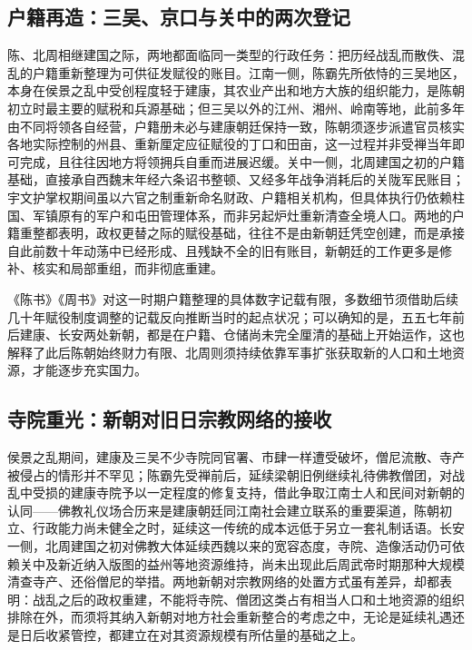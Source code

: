 \subsection{户籍再造：三吴、京口与关中的两次登记}

陈、北周相继建国之际，两地都面临同一类型的行政任务：把历经战乱而散佚、混乱的户籍重新整理为可供征发赋役的账目。江南一侧，陈霸先所依恃的三吴地区，本身在侯景之乱中受创程度轻于建康，其农业产出和地方大族的组织能力，是陈朝初立时最主要的赋税和兵源基础；但三吴以外的江州、湘州、岭南等地，此前多年由不同将领各自经营，户籍册未必与建康朝廷保持一致，陈朝须逐步派遣官员核实各地实际控制的州县、重新厘定应征赋役的丁口和田亩，这一过程并非受禅当年即可完成，且往往因地方将领拥兵自重而进展迟缓。关中一侧，北周建国之初的户籍基础，直接承自西魏末年经六条诏书整顿、又经多年战争消耗后的关陇军民账目；宇文护掌权期间虽以六官之制重新命名财政、户籍相关机构，但具体执行仍依赖柱国、军镇原有的军户和屯田管理体系，而非另起炉灶重新清查全境人口。两地的户籍重整都表明，政权更替之际的赋役基础，往往不是由新朝廷凭空创建，而是承接自此前数十年动荡中已经形成、且残缺不全的旧有账目，新朝廷的工作更多是修补、核实和局部重组，而非彻底重建。

《陈书》《周书》对这一时期户籍整理的具体数字记载有限，多数细节须借助后续几十年赋役制度调整的记载反向推断当时的起点状况；可以确知的是，五五七年前后建康、长安两处新朝，都是在户籍、仓储尚未完全厘清的基础上开始运作，这也解释了此后陈朝始终财力有限、北周则须持续依靠军事扩张获取新的人口和土地资源，才能逐步充实国力。

\subsection{寺院重光：新朝对旧日宗教网络的接收}

侯景之乱期间，建康及三吴不少寺院同官署、市肆一样遭受破坏，僧尼流散、寺产被侵占的情形并不罕见；陈霸先受禅前后，延续梁朝旧例继续礼待佛教僧团，对战乱中受损的建康寺院予以一定程度的修复支持，借此争取江南士人和民间对新朝的认同——佛教礼仪场合历来是建康朝廷同江南社会建立联系的重要渠道，陈朝初立、行政能力尚未健全之时，延续这一传统的成本远低于另立一套礼制话语。长安一侧，北周建国之初对佛教大体延续西魏以来的宽容态度，寺院、造像活动仍可依赖关中及新近纳入版图的益州等地资源维持，尚未出现此后周武帝时期那种大规模清查寺产、还俗僧尼的举措。两地新朝对宗教网络的处置方式虽有差异，却都表明：战乱之后的政权重建，不能将寺院、僧团这类占有相当人口和土地资源的组织排除在外，而须将其纳入新朝对地方社会重新整合的考虑之中，无论是延续礼遇还是日后收紧管控，都建立在对其资源规模有所估量的基础之上。

